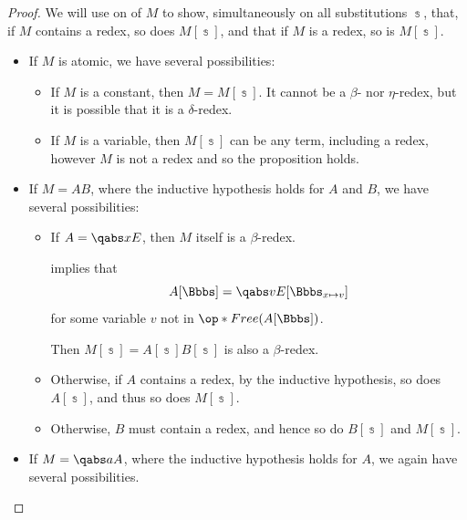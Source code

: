 \begin{proof}
   We will use  on of \( M \) to show, simultaneously on all substitutions \( \Bbbs \), that, if \( M \) contains a redex, so does \( M[\Bbbs] \), and that if \( M \) is a redex, so is \( M[\Bbbs] \).

  \begin{itemize}
    \item If \( M \) is atomic, we have several possibilities:
    \begin{itemize}
      \item If \( M \) is a constant, then \( M = M[\Bbbs] \). It cannot be a \( \beta \)- nor \( \eta \)-redex, but it is possible that it is a \( \delta \)-redex.

      \item If \( M \) is a variable, then \( M[\Bbbs] \) can be any term, including a redex, however \( M \) is not a redex and so the proposition holds.
    \end{itemize}

    \item If \( M = AB \), where the inductive hypothesis holds for \( A \) and \( B \), we have several possibilities:
    \begin{itemize}
      \item If \( A = \qabs x E \), then \( M \) itself is a \( \beta \)-redex.

       implies that
      \begin{equation*}
        A[\Bbbs] = \qabs v E[\Bbbs_{x \mapsto v}]
      \end{equation*}
      for some variable \( v \) not in \( \op*{Free}(A[\Bbbs]) \).

      Then \( M[\Bbbs] = A[\Bbbs] B[\Bbbs] \) is also a \( \beta \)-redex.

      \item Otherwise, if \( A \) contains a redex, by the inductive hypothesis, so does \( A[\Bbbs] \), and thus so does \( M[\Bbbs] \).

      \item Otherwise, \( B \) must contain a redex, and hence so do \( B[\Bbbs] \) and \( M[\Bbbs] \).
    \end{itemize}

    \item If \( M = \qabs a A \), where the inductive hypothesis holds for \( A \), we again have several possibilities.


\end{itemize}
\end{proof}
